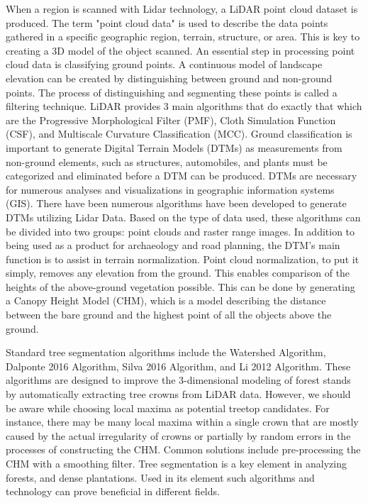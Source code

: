\documentclass[a4paper, 12pt]{article}
\begin{document}
When a region is scanned with Lidar technology, a LiDAR point cloud dataset is produced. The term "point cloud data" is used to describe the data points gathered in a specific geographic region, terrain, structure, or area. This is key to creating a 3D model of the object scanned. An essential step in processing point cloud data is classifying ground points. A continuous model of landscape elevation can be created by distinguishing between ground and non-ground points. The process of distinguishing and segmenting these points is called a filtering technique. LiDAR provides 3 main algorithms that do exactly that which are the Progressive Morphological Filter (PMF), Cloth Simulation Function (CSF), and Multiscale Curvature Classification (MCC). Ground classification is important to generate Digital Terrain Models (DTMs) as measurements from non-ground elements, such as structures, automobiles, and plants must be categorized and eliminated before a DTM can be produced. DTMs are necessary for numerous analyses and visualizations in geographic information systems (GIS). There have been numerous algorithms have been developed to generate DTMs utilizing Lidar Data. Based on the type of data used, these algorithms can be divided into two groups: point clouds and raster range images. In addition to being used as a product for archaeology and road planning, the DTM's main function is to assist in terrain normalization. Point cloud normalization, to put it simply, removes any elevation from the ground. This enables comparison of the heights of the above-ground vegetation possible. This can be done by generating a Canopy Height Model (CHM), which is a model describing the distance between the bare ground and the highest point of all the objects above the ground.

Standard tree segmentation algorithms include the Watershed Algorithm, Dalponte 2016 Algorithm, Silva 2016 Algorithm, and Li 2012 Algorithm. These algorithms are designed to improve the 3-dimensional modeling of forest stands by automatically extracting tree crowns from LiDAR data. However, we should be aware while choosing local maxima as potential treetop candidates. For instance, there may be many local maxima within a single crown that are mostly caused by the actual irregularity of crowns or partially by random errors in the processes of constructing the CHM. Common solutions include pre-processing the CHM with a smoothing filter. \cite{3} Tree segmentation is a key element in analyzing forests, and dense plantations. Used in its element such algorithms and technology can prove beneficial in different fields. 
\end{document}
